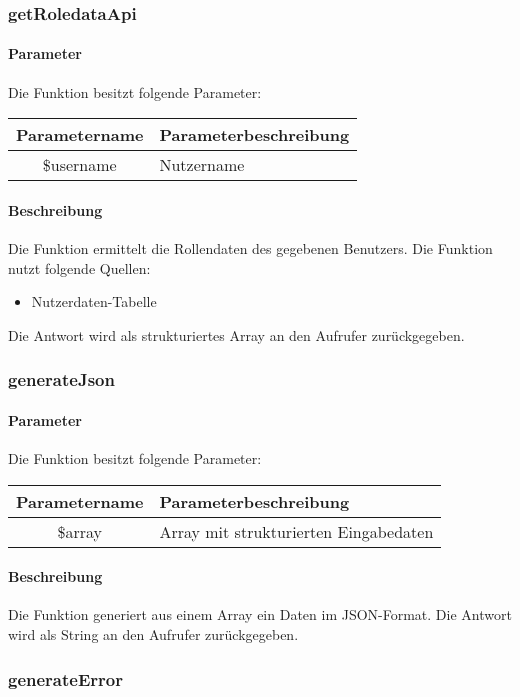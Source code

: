 \subsubsection{getRoledataApi}
\paragraph{Parameter} Die Funktion besitzt folgende Parameter:
\begin{table}[H]
	\begin{tabular}{|c|p{11cm}|}
		\hline
		\textbf{Parametername} & \textbf{Parameterbeschreibung} \\ \hline
		\$username & Nutzername \\ \hline
	\end{tabular}
\end{table}
\paragraph{Beschreibung} Die Funktion ermittelt die Rollendaten des gegebenen Benutzers. Die Funktion nutzt folgende Quellen:
\begin{itemize}
	\item Nutzerdaten-Tabelle
\end{itemize}
Die Antwort wird als strukturiertes Array an den Aufrufer zurückgegeben.
\subsubsection{generateJson}
\paragraph{Parameter} Die Funktion besitzt folgende Parameter:
\begin{table}[H]
	\begin{tabular}{|c|p{11cm}|}
		\hline
		\textbf{Parametername} & \textbf{Parameterbeschreibung} \\ \hline
		\$array & Array mit strukturierten Eingabedaten \\ \hline
	\end{tabular}
\end{table}
\paragraph{Beschreibung} Die Funktion generiert aus einem Array ein Daten im JSON-Format. Die Antwort wird als String an den Aufrufer zurückgegeben.
\subsubsection{generateError}

